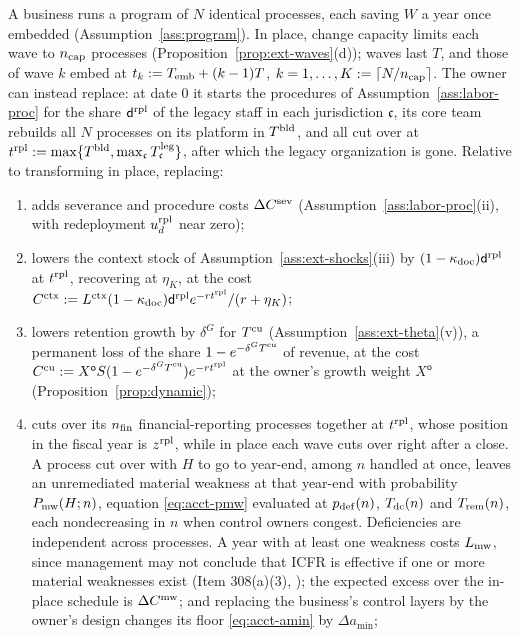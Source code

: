 \begin{assumption}[Replacement]\label{ass:acq-replace}
A business runs a program of $N$ identical processes, each saving $W$ a year once embedded (Assumption~\ref{ass:program}). In place, change capacity limits each wave to $n_{\rm cap}$ processes (Proposition~\ref{prop:ext-waves}(d)); waves last $T$, and those of wave $k$ embed at $t_k:=T_{\rm emb}+(k-1)T$, $k=1,\dots,K:=\lceil N/n_{\rm cap}\rceil$. The owner can instead replace: at date 0 it starts the procedures of Assumption~\ref{ass:labor-proc} for the share $\mathsf d^{\rm rpl}$ of the legacy staff in each jurisdiction $\mathfrak c$, its core team rebuilds all $N$ processes on its platform in $T^{\rm bld}$, and all cut over at $t^{\rm rpl}:=\max\{T^{\rm bld},\max_{\mathfrak c}T^{\rm leg}_{\mathfrak c}\}$, after which the legacy organization is gone. Relative to transforming in place, replacing:
\begin{enumerate}
\item[(i)] adds severance and procedure costs $\Delta C^{\rm sev}$ (Assumption~\ref{ass:labor-proc}(ii), with redeployment $u^{\rm rpl}_d$ near zero);
\item[(ii)] lowers the context stock of Assumption~\ref{ass:ext-shocks}(iii) by $(1-\kappa_{\rm doc})\mathsf d^{\rm rpl}$ at $t^{\rm rpl}$, recovering at $\eta_K$, at the cost $C^{\rm ctx}:=L^{\rm ctx}(1-\kappa_{\rm doc})\mathsf d^{\rm rpl}e^{-rt^{\rm rpl}}/(r+\eta_K)$;
\item[(iii)] lowers retention growth by $\delta^G$ for $T^{\rm cu}$ (Assumption~\ref{ass:ext-theta}(v)), a permanent loss of the share $1-e^{-\delta^GT^{\rm cu}}$ of revenue, at the cost $C^{\rm cu}:=X^{\mathsf o}S(1-e^{-\delta^GT^{\rm cu}})e^{-rt^{\rm rpl}}$ at the owner's growth weight $X^{\mathsf o}$ (Proposition~\ref{prop:dynamic});
\item[(iv)] cuts over its $n_{\rm fin}$ financial-reporting processes together at $t^{\rm rpl}$, whose position in the fiscal year is $z^{\rm rpl}$, while in place each wave cuts over right after a close. A process cut over with $H$ to go to year-end, among $n$ handled at once, leaves an unremediated material weakness at that year-end with probability $P_{\rm mw}(H;n)$, equation \eqref{eq:acct-pmw} evaluated at $p_{\rm def}(n)$, $T_{\rm dc}(n)$ and $T_{\rm rem}(n)$, each nondecreasing in $n$ when control owners congest. Deficiencies are independent across processes. A year with at least one weakness costs $L_{\rm mw}$, since management may not conclude that ICFR is effective if one or more material weaknesses exist (Item 308(a)(3), \citealp{cfr2026sec229308}); the expected excess over the in-place schedule is $\Delta C^{\rm mw}$; and replacing the business's control layers by the owner's design changes its floor \eqref{eq:acct-amin} by $\Delta a_{\min}$;

\end{enumerate}
\end{assumption}
